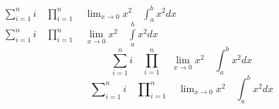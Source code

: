 $ \sum_{i=1}^n i\quad \prod_{i=1}^n\quad 
  \lim_{x\to0}x^2\quad \int_a^b x^2 dx $\\
$ \sum\limits_{i=1}^n i\quad \prod\limits_{i=1}^n\quad 
  \lim\limits_{x\to0}x^2\quad \int\limits_a^b x^2 dx $
\[ \sum_{i=1}^n i\quad \prod_{i=1}^n\quad 
  \lim_{x\to0}x^2\quad \int_a^b x^2 dx \]
\[ \sum\nolimits_{i=1}^n i\quad 
  \prod\nolimits_{i=1}^n\quad 
  \lim\nolimits_{x\to0}x^2\quad 
  \int\nolimits_a^b x^2 dx \]
